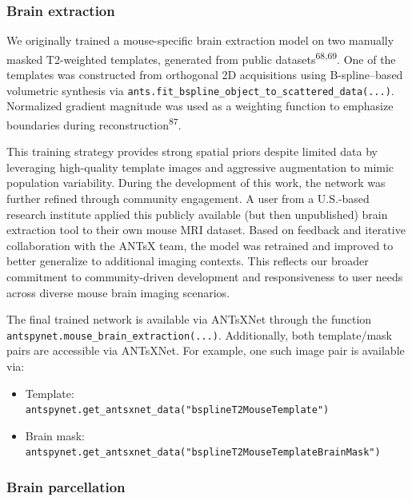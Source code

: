 \documentclass[
  12pt,
]{article}
\providecommand{\tightlist}{%
  \setlength{\itemsep}{0pt}\setlength{\parskip}{0pt}}
\begin{document}
\subsubsection{Brain extraction}\label{brain-extraction}

We originally trained a mouse-specific brain extraction model on two
manually masked T2-weighted templates, generated from public
datasets\textsuperscript{68,69}. One of the templates was constructed
from orthogonal 2D acquisitions using B-spline--based volumetric
synthesis via
\texttt{ants.fit\_bspline\_object\_to\_scattered\_data(...)}. Normalized
gradient magnitude was used as a weighting function to emphasize
boundaries during reconstruction\textsuperscript{87}.

This training strategy provides strong spatial priors despite limited
data by leveraging high-quality template images and aggressive
augmentation to mimic population variability. During the development of
this work, the network was further refined through community engagement.
A user from a U.S.-based research institute applied this publicly
available (but then unpublished) brain extraction tool to their own
mouse MRI dataset. Based on feedback and iterative collaboration with
the ANTsX team, the model was retrained and improved to better
generalize to additional imaging contexts. This reflects our broader
commitment to community-driven development and responsiveness to user
needs across diverse mouse brain imaging scenarios.

The final trained network is available via ANTsXNet through the
function\\
\texttt{antspynet.mouse\_brain\_extraction(...)}. Additionally, both
template/mask pairs are accessible via ANTsXNet. For example, one such
image pair is available via:

\begin{itemize}
\tightlist
\item
  Template:\\
  \texttt{antspynet.get\_antsxnet\_data("bsplineT2MouseTemplate")}
\item
  Brain mask:\\
  \texttt{antspynet.get\_antsxnet\_data("bsplineT2MouseTemplateBrainMask")}
\end{itemize}

\subsubsection{Brain parcellation}\label{brain-parcellation}
\end{document}
